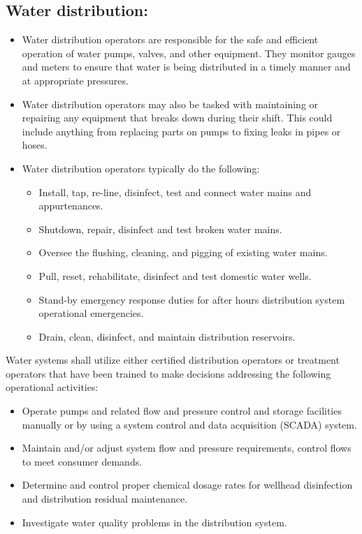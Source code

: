 \subsection{Water distribution:}
\begin{itemize}
\item Water distribution operators are responsible for the safe and efficient operation of water pumps, valves, and other equipment. They monitor gauges and meters to ensure that water is being distributed in a timely manner and at appropriate pressures.

\item Water distribution operators may also be tasked with maintaining or repairing any equipment that breaks down during their shift. This could include anything from replacing parts on pumps to fixing leaks in pipes or hoses.
\item Water distribution operators typically do the following:
\begin{itemize}
\item Install, tap, re-line, disinfect, test and connect water mains and appurtenances.
\item Shutdown, repair, disinfect and test broken water mains.
\item Oversee the flushing, cleaning, and pigging of existing water mains.
\item Pull, reset, rehabilitate, disinfect and test domestic water wells.
\item Stand-by emergency response duties for after hours distribution system operational emergencies.
\item Drain, clean, disinfect, and maintain distribution reservoirs.
\end{itemize}
\end{itemize}
Water systems shall utilize either certified distribution operators or treatment operators that have been trained to make decisions addressing the following operational activities:\\
\begin{itemize}
\item Operate pumps and related flow and pressure control and storage facilities manually or by using a system control and data acquisition (SCADA) system.
\item Maintain and/or adjust system flow and pressure requirements, control flows to meet consumer demands.
\item Determine and control proper chemical dosage rates for wellhead disinfection and distribution residual maintenance.
\item Investigate water quality problems in the distribution system.
\end{itemize}


